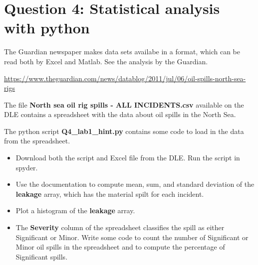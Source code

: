 \section*{Question 4: Statistical analysis with python}


The Guardian newspaper makes data sets availabe
in a format, which can be read both by Excel
and Matlab. See the analysis by the Guardian.

\url{https://www.theguardian.com/news/datablog/2011/jul/06/oil-spills-north-sea-rigs}

The file \textbf{North sea oil rig spills - ALL INCIDENTS.csv}
available on the DLE contains a spreadsheet with the data about
oil spills in the North Sea.

The python script \textbf{Q4\_lab1\_hint.py}  contains some code
to load in the data from the spreadsheet.


\begin{itemize}

\item Download both the script and Excel file from the DLE. Run the 
      script in spyder.

\item Use the documentation to compute mean, sum, and standard deviation of 
      the \textbf{leakage} array, which has the material spilt for each incident. 

\item Plot a histogram of the \textbf{leakage} array.

\item The \textbf{Severity} column of the spreadsheet classifies the
  spill as either Significant or Minor. Write some code to count the
  number of Significant or Minor oil spills in the spreadsheet and to
  compute the percentage of Significant spills.
      

\end{itemize}

